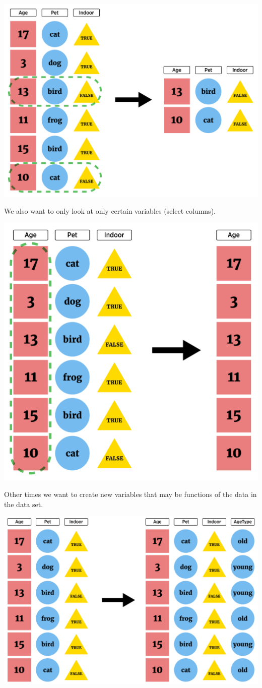 \documentclass[
]{book}
\theoremstyle{definition}
\theoremstyle{definition}
\theoremstyle{definition}
\theoremstyle{remark}
\begin{document}
\begin{center}\includegraphics[width=0.8\linewidth]{img/filterVisualF} \end{center}

We also want to only look at only certain variables (select columns).

\begin{center}\includegraphics[width=0.7\linewidth]{img/selectVisualF} \end{center}

Other times we want to create new variables that may be functions of the data in the data set.

\begin{center}\includegraphics[width=0.8\linewidth]{img/createVarVisualF} \end{center}
\end{document}
